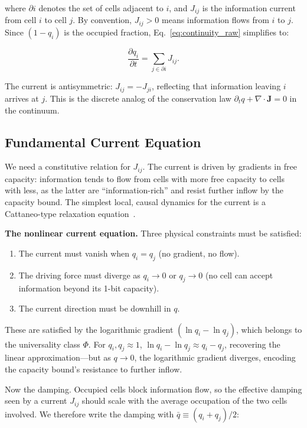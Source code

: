 \documentclass[aps,prd,twocolumn,showpacs,superscriptaddress,preprintnumbers]{revtex4-2}
\begin{document}
where $\partial i$ denotes the set of cells adjacent to $i$, and $J_{ij}$ is the information current from cell $i$ to cell $j$.
By convention, $J_{ij}>0$ means information flows from $i$ to $j$.
Since $(1-q_i)$ is the occupied fraction, Eq.~\eqref{eq:continuity_raw} simplifies to:

\begin{equation}
\boxed{\frac{\partial q_i}{\partial t} = \sum_{j \in \partial i} J_{ij}}.
\label{eq:continuity}
\end{equation}

The current is antisymmetric: $J_{ij}=-J_{ji}$, reflecting that information leaving $i$ arrives at $j$.
This is the discrete analog of the conservation law $\partial_t q + \nabla\cdot\mathbf{J}=0$ in the continuum.

\subsection{Fundamental Current Equation}

We need a constitutive relation for $J_{ij}$.
The current is driven by gradients in free capacity: information tends to flow from cells with more free capacity to cells with less, as the latter are ``information-rich'' and resist further inflow by the capacity bound.
The simplest local, causal dynamics for the current is a Cattaneo-type relaxation equation~\cite{Cattaneo:1948,Jou:2010}.

\textbf{The nonlinear current equation.}
Three physical constraints must be satisfied:
\begin{enumerate}
    \item The current must vanish when $q_i=q_j$ (no gradient, no flow).
    \item The driving force must diverge as $q_i\to0$ or $q_j\to0$ (no cell can accept information beyond its 1-bit capacity).
    \item The current direction must be downhill in $q$.
\end{enumerate}

These are satisfied by the logarithmic gradient $(\ln q_i-\ln q_j)$, which belongs to the universality class $\Phi$.
For $q_i,q_j\approx1$, $\ln q_i-\ln q_j\approx q_i-q_j$, recovering the linear approximation---but as $q\to0$, the logarithmic gradient diverges, encoding the capacity bound's resistance to further inflow.

Now the damping.
Occupied cells block information flow, so the effective damping seen by a current $J_{ij}$ should scale with the average occupation of the two cells involved.
We therefore write the damping with $\bar{q}\equiv(q_i+q_j)/2$:
\end{document}
